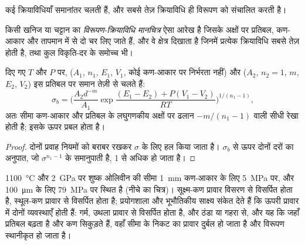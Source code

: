 कई क्रियाविधियाँ समानांतर चलती हैं, और सबसे तेज़ क्रियाविधि ही विरूपण को संचालित करती है।

\begin{definition}[विरूपण-क्रियाविधि मानचित्र]\label{def:b3:deformation-mechanisms:deformation-map}
किसी खनिज या चट्टान का \emph{विरूपण-क्रियाविधि मानचित्र}
ऐसा आरेख है जिसके अक्षों पर प्रतिबल, कण-आकार और तापमान में से दो चर लिए जाते हैं,
और वे क्षेत्र दिखाता है जिनमें प्रत्येक क्रियाविधि सबसे तेज़ होती है,
तथा कुल विकृति-दर के समोच्च भी।
\end{definition}

\begin{proposition}[क्रियाविधि-सीमा]\label{prop:b3:deformation-mechanisms:boundary}
दिए गए $T$ और $P$ पर,  ($A_1$, $n_1$, $E_1$, $V_1$, कोई
कण-आकार पर निर्भरता नहीं) और  ($A_2$, $n_2 = 1$, $m$, $E_2$, $V_2$)
इस प्रतिबल पर समान तेज़ी से चलते हैं:
\[
  \sigma_b = \biggl(\frac{A_2d^{-m}}{A_1}
  \exp\frac{(E_1 - E_2) + P(V_1 - V_2)}{RT}\biggr)^{1/(n_1 - 1)} ,
\]
अतः सीमा कण-आकार और प्रतिबल के लघुगणकीय अक्षों पर ढलान $-m/(n_1 - 1)$ वाली सीधी रेखा होती है;
इसके ऊपर  प्रबल होता है।
\end{proposition}

\begin{proof}
दोनों प्रवाह नियमों को बराबर रखकर $\sigma$ के लिए हल किया जाता है। $\sigma_b$ से ऊपर
दोनों दरों का अनुपात, जो $\sigma^{n_1 - 1}$ के समानुपाती है, 1 से अधिक हो जाता है।
\end{proof}

\qty{1100}{\celsius} और \qty{2}{GPa} पर शुष्क ओलिवीन की सीमा
\qty{1}{mm} कण-आकार के लिए \qty{5}{MPa} पर, और
\qty{100}{\micro m} के लिए \qty{79}{MPa} पर स्थित है (नीचे का चित्र)। सूक्ष्म-कण प्रावार विसरण से विसर्पित होता है,
स्थूल-कण प्रावार  से विसर्पित होता है; प्रयोगशाला और भूभौतिकीय साक्ष्य
संकेत देते हैं कि ऊपरी प्रावार में दोनों व्यवस्थाएँ होती हैं: गर्म, उथला प्रावार
 से विसर्पित होता है, और ठंडा या गहरा  से, और यह कि जहाँ
प्रतिबल बढ़ता है और कण सिकुड़ते हैं, वहाँ सीमा के निकट का प्रावार दुर्बल हो जाता है
और विरूपण स्थानीकृत हो जाता है।

